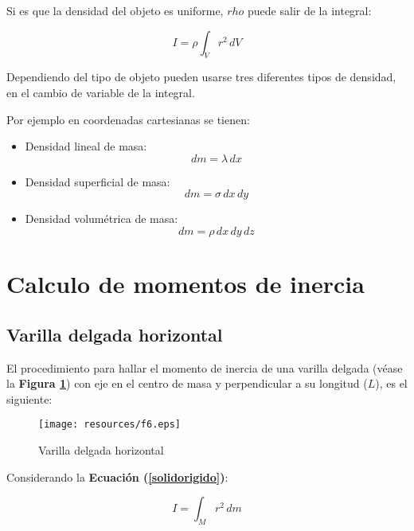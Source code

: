 \documentclass[letter,twoside,11pt]{article}
\begin{document}
Si es que la densidad del objeto es uniforme, $rho$ puede salir de la integral:

\begin{equation}
    I = \rho \int_{V} r^2\, dV
\end{equation}

Dependiendo del tipo de objeto pueden usarse tres diferentes tipos de densidad,
en el cambio de variable de la integral.

Por ejemplo en coordenadas cartesianas se tienen:

\begin{itemize}
\item Densidad lineal de masa:
\begin{equation*}
    dm = \lambda\, dx
\end{equation*}

\item Densidad superficial de masa:
\begin{equation*}
    dm = \sigma\, dx\, dy
\end{equation*}

\item Densidad volumétrica de masa:
\begin{equation*}
    dm = \rho\, dx\, dy\, dz
\end{equation*}
\end{itemize}

\section{Calculo de momentos de inercia}

\subsection{Varilla delgada horizontal}
El procedimiento para hallar el momento de inercia de una varilla delgada (véase
la \textbf{Figura \ref{figura6}}) con eje en el centro de masa y perpendicular a
su longitud ($L$), es el siguiente:

\begin{figure}
\centering
\texttt{[image: resources/f6.eps]}
\caption{Varilla delgada horizontal}
\label{figura6}
\end{figure}

Considerando la \textbf{Ecuación (\ref{solidorigido})}:

\begin{equation*}
    I = \int_{M} r^2\, dm
\tag{4}
\end{equation*}
\end{document}
